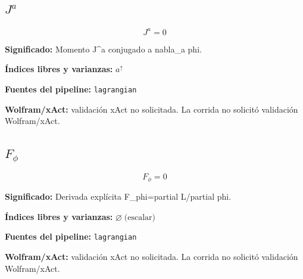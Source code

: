 \documentclass[11pt]{article}
\begin{document}
\subsection*{$ J^a $}
\begin{dmath*}[breakdepth={5}]
J^a = 0
\end{dmath*}
\par\vspace{1.2\baselineskip}\noindent
\begin{minipage}{\linewidth}
\textbf{Significado:} Momento J^a conjugado a nabla\_a phi.\par
\textbf{Índices libres y varianzas:} $ a^{\uparrow} $\par
\textbf{Fuentes del pipeline:} \texttt{lagrangian}\par
\textbf{Wolfram/xAct:} validación xAct no solicitada. La corrida no solicitó validación Wolfram/xAct.\par
\end{minipage}
\subsection*{$ F_{\phi} $}
\begin{dmath*}[breakdepth={5}]
F_{\phi} = 0
\end{dmath*}
\par\vspace{1.2\baselineskip}\noindent
\begin{minipage}{\linewidth}
\textbf{Significado:} Derivada explícita F\_phi=partial L/partial phi.\par
\textbf{Índices libres y varianzas:} $ \varnothing\;\text{(escalar)} $\par
\textbf{Fuentes del pipeline:} \texttt{lagrangian}\par
\textbf{Wolfram/xAct:} validación xAct no solicitada. La corrida no solicitó validación Wolfram/xAct.\par
\end{minipage}
\end{document}
